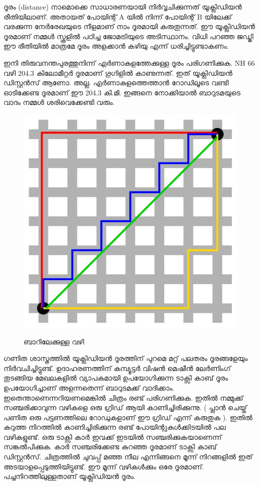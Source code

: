 \documentclass[10pt,a4paper]{report}
\begin{document}
ദൂരം (distance) നാമൊക്കെ സാധാരണയായി നിർവ്വചിക്കുന്നത് യൂക്ലിഡിയൻ രീതിയിലാണ്. അതായത് പോയിന്റ് A യിൽ നിന്ന് പോയിന്റ് B യിലേക്ക് വരക്കുന്ന നേർരേഖയുടെ നീളമാണ് നാം ദൂരമായി കരുതുന്നത്.  ഈ യൂക്ലിഡിയൻ ദൂരമാണ് നമ്മൾ സ്കൂളിൽ പഠിച്ച ജോമട്രിയുടെ അടിസ്ഥാനം. വിധി പറഞ്ഞ ജഡ്ജി ഈ രീതിയിൽ മാത്രമേ ദൂരം അളക്കാൻ കഴിയു എന്ന് ധരിച്ചിട്ടുണ്ടാകണം. 

             ഇനി തിരുവനന്തപുരത്തുനിന്ന് എർണാകുളത്തേക്കുള്ള ദൂരം പരിഗണിക്കുക. NH 66 വഴി 204.3 കിലോമീറ്റർ ദൂരമാണ് ഗൂഗിളിൽ കാണുന്നത്. ഇത് യൂക്ലിഡിയൻ ഡിസ്റ്റൻസ് ആണോ. അല്ല. എർണാകുളത്തെത്താൻ റോഡിലൂടെ വണ്ടി ഓടിക്കേണ്ട ദൂരമാണ് ഈ 204.3 കി.മി. ഇങ്ങനെ നോക്കിയാൽ ബാറുടമയുടെ വാദം നമ്മൾ ശരിവെക്കേണ്ടി വരും.
         \begin{figure}[H]
  \center
\includegraphics[scale=.25]{images/bar2}
\label{bar2}
\caption{   ബാറിലേക്കുള്ള വഴി }
\end{figure}     
            ഗണിത ശാസ്ത്രത്തിൽ യൂക്ലിഡിയൻ ദൂരത്തിന് പുറമെ മറ്റ് പലതരം ദൂരങ്ങളേയും നിർവചിച്ചിട്ടുണ്ട്.   ഉദാഹരണത്തിന്  കമ്പ്യൂട്ടർ വിഷൻ  മെഷീൻ ലേർണിംഗ് തുടങ്ങിയ മേഖലകളിൽ വ്യാപകമായി ഉപയോഗിക്കുന്ന  ടാക്സി കാബ് ദൂരം  ഉപയോഗിച്ചാണ് അളന്നതെന്ന്  ബാറുടമക്ക് വാദിക്കാം. ഇതെന്താണെന്നറിയണമെങ്കിൽ ചിത്രം രണ്ട് പരിഗണിക്കുക. ഇതിൽ നമ്മുക്ക് സഞ്ചരിക്കാവുന്ന വഴികളെ ഒരു ഗ്രിഡ് ആയി കാണിച്ചിരിക്കുന്നു.  ( പ്ലാൻ ചെയ്ത് പണിത ഒരു പട്ടണത്തിലെ റോഡുകളാണ് ഈ ഗ്രിഡ് എന്ന് കരുതുക ).  ഇതിൽ കറുത്ത നിറത്തിൽ കാണിച്ചിരിക്കുന്ന രണ്ട് പോയിന്റുകൾക്കിടയിൽ പല വഴികളുണ്ട്. ഒരു ടാക്സി കാർ ഇവക്ക് ഇടയിൽ സഞ്ചരിക്കുകയാണെന്ന് സങ്കൽപിക്കുക. കാർ സഞ്ചരിക്കേണ്ട കുറഞ്ഞ ദൂരമാണ് ടാക്സി കാബ് ഡിസ്റ്റൻസ്. ചിത്രത്തിൽ ചുവപ്പ് മഞ്ഞ നീല എന്നിങ്ങനെ മൂന്ന് നിറങ്ങളിൽ ഇത് അടയാളപ്പെടുത്തിയിട്ടുണ്ട്.  ഈ മൂന്ന് വഴികൾക്കും ഒരേ ദൂരമാണ്.  പച്ചനിറത്തിലുള്ളതാണ് യൂക്ലിഡിയൻ  ദൂരം.
 
\end{document}

